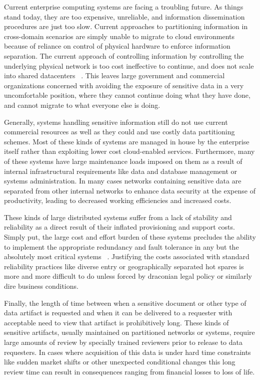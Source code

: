 Current enterprise computing systems are facing a troubling future.  As things stand today, they are too expensive, unreliable, and information dissemination procedures are just too slow.  Current approaches to partitioning information in cross-domain scenarios are simply unable to migrate to cloud environments because of reliance on control of physical hardware to enforce information separation.  The current approach of controlling information by controlling the underlying physical network is too cost ineffective to continue, and does not scale into shared datacenters ~\cite{RedBook}.  This leaves large government and commercial organizations concerned with avoiding the exposure of sensitive data in a very uncomfortable position, where they cannot continue doing what they have done, and cannot migrate to what everyone else is doing.

Generally, systems handling sensitive information still do not use current commercial resources as well as they could and use costly data partitioning schemes.  Most of these kinds of systems are managed in house by the enterprise itself rather than exploiting lower cost cloud-enabled services.  Furthermore, many of these systems have large maintenance loads imposed on them as a result of internal infrastructural requirements like data and database management or systems administration.  In many cases networks containing sensitive data are separated from other internal networks to enhance data security at the expense of productivity, leading to decreased working efficiencies and increased costs.

These kinds of large distributed systems suffer from a lack of stability and reliability as a direct result of their inflated provisioning and support costs.  Simply put, the large cost and effort burden of these systems precludes the ability to implement the appropriate redundancy and fault tolerance in any but the absolutely most critical systems ~\cite{Tallon:2010:UDI:1735223.1735253}.  Justifying the costs associated with standard reliability practices like diverse entry or geographically separated hot spares is more and more difficult to do unless forced by draconian legal policy or similarly dire business conditions.

Finally, the length of time between when a sensitive document or other type of data artifact is requested and when it can be delivered to a requester with acceptable need to view that artifact is prohibitively long.  These kinds of sensitive artifacts, usually maintained on partitioned networks or systems, require large amounts of review by specially trained reviewers prior to release to data requesters.  In cases where acquisition of this data is under hard time constraints like sudden market shifts or other unexpected conditional changes this long review time can result in consequences ranging from financial losses to loss of life.

